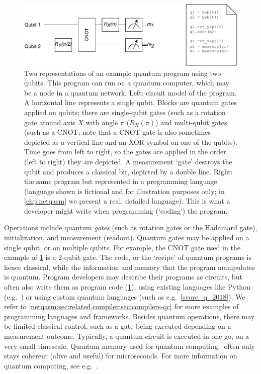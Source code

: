 \begin{figure}[t]
    \centering
    \includegraphics[width=0.8\linewidth]{figures/background/local_circuit.pdf}
    \caption{
        Two representations of an example quantum program using two qubits.
        This program can run on a quantum computer, which may be a node in a quantum network.
        Left: circuit model of the program.
        A horizontal line represents a single qubit.
        Blocks are quantum gates applied on qubits; there are single-qubit gates (such as a rotation gate around axis $X$ with angle $\pi$ ($R_X(\pi)$) and multi-qubit gates (such as a CNOT; note that a CNOT gate is also sometimes depicted as a vertical line and an XOR symbol on one of the qubits).
        Time goes from left to right, so the gates are applied in the order (left to right) they are depicted.
        A measurement `gate' destroys the qubit and produces a classical bit, depicted by a double line.
        Right: the same program but represented in a programming language (language shown is fictional and for illustration purposes only; in \cref{chp:netqasm} we present a real, detailed language).
        This is what a developer might write when programming (`coding') the program.
    }
    \label{background:fig:local_circuit}
\end{figure}

Operations include quantum \emph{gates} (such as rotation gates or the Hadamard gate), initialization, and measurement (readout).
Quantum gates may be applied on a single qubit, or on multiple qubits.
For example, the CNOT gate used in the example of \cref{background:fig:local_circuit} is a 2-qubit gate.
The code, or the `recipe' of quantum programs is hence classical, while the information and memory that the program manipulates is quantum.
Program developers may describe their programs as circuits, but often also write them as program code (\cref{background:fig:local_circuit}), using existing languages like Python (e.g.~\cite{steiger_projectq_2018}) or using custom quantum languages (such as e.g.~\cref{svore_q_2018}).
We refer to \cref{netqasm:sec:related,compiler:sec:compilers-qc} for more examples of programming languages and frameworks.
Besides quantum operations, there may be limited classical control, such as a gate being executed depending on a measurement outcome.
Typically, a quantum circuit is executed in one go, on a very small timescale.
Quantum memory used for quantum computing~\cite{de_leon_materials_2021} often only stays coherent (alive and useful) for microseconds.
For more information on quantum computing, see e.g.~\cite{nielsen_chuang_2002}.

